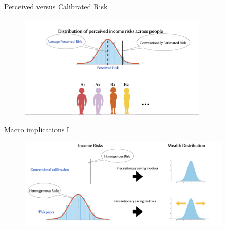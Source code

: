 \documentclass{beamer}
\begin{document}
\begin{frame}{Perceived versus Calibrated Risk}
	\begin{figure}
		\centering
		\label{fig: findings}
		\includegraphics[width=0.8\textwidth]{figures/2findings.png}
	\end{figure}
	
\end{frame}



\begin{frame}{Macro implications I}
	\begin{figure}
	\centering
	\label{fig: implication1}
	\includegraphics[width=0.9\textwidth]{figures/implication1.png}
\end{figure}
\end{frame}
\end{document}
